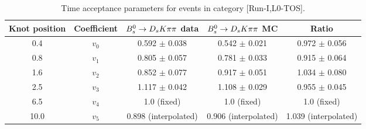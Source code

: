 \begin{table}[hp!]
\centering
\small
\caption{Time acceptance parameters for events in category [\textsf{Run-I},\textsf{L0-TOS}].}
\begin{tabular}{c c c c c}
\hline
\hline
Knot position & Coefficient & ${{B}^0_{s}}\rightarrow{\ensuremath{{D}_{s}}}{\ensuremath{K}}{\ensuremath{\pi}}{\ensuremath{\pi}}$ data & ${{B}^0_{s}}\rightarrow{\ensuremath{{D}_{s}}}{\ensuremath{K}}{\ensuremath{\pi}}{\ensuremath{\pi}}$ MC & Ratio \\
\hline
0.4 & $v_{0}$ & 0.592 $\pm$ 0.038 & 0.542 $\pm$ 0.021 & 0.972 $\pm$ 0.056\\
0.8 & $v_{1}$ & 0.805 $\pm$ 0.057 & 0.781 $\pm$ 0.033 & 0.915 $\pm$ 0.064\\
1.6 & $v_{2}$ & 0.852 $\pm$ 0.077 & 0.917 $\pm$ 0.051 & 1.034 $\pm$ 0.080\\
2.5 & $v_{3}$ & 1.117 $\pm$ 0.042 & 1.108 $\pm$ 0.029 & 0.955 $\pm$ 0.045\\
6.5 & $v_{4}$ &  1.0 (fixed) & 1.0 (fixed) & 1.0 (fixed)\\
10.0 & $v_{5}$ & 0.898 (interpolated) & 0.906 (interpolated) & 1.039 (interpolated) \\
\hline
\hline
\end{tabular}
\label{table:splines}
\end{table}